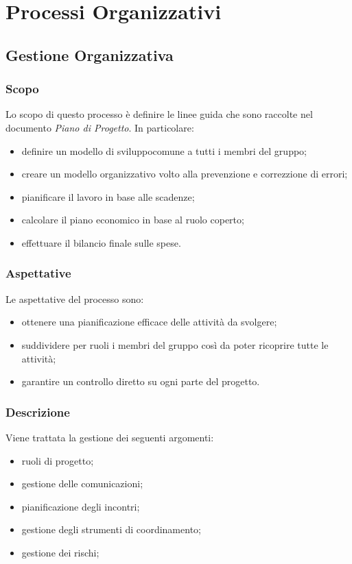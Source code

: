 \section{Processi Organizzativi}
	\subsection{Gestione Organizzativa}
		\subsubsection{Scopo}

		Lo scopo di questo processo è definire le linee guida che sono raccolte nel documento \textit{Piano di Progetto}. In particolare:
		\begin{itemize}
			\item definire un modello di sviluppo\glosp comune a tutti i membri del gruppo; 
			\item creare un modello organizzativo volto alla prevenzione e correzzione di errori;
			\item pianificare il lavoro in base alle scadenze;
			\item calcolare il piano economico in base al ruolo coperto;
			\item effettuare il bilancio finale sulle spese.
		\end{itemize}

		\subsubsection{Aspettative}
		Le aspettative del processo sono:
		\begin{itemize}
			\item ottenere una pianificazione efficace delle attività da svolgere;
			\item suddividere per ruoli i membri del gruppo così da poter ricoprire tutte le attività;
			\item garantire un controllo diretto su ogni parte del progetto.
		\end{itemize}
		\subsubsection{Descrizione}
		Viene trattata la gestione dei seguenti argomenti:
		\begin{itemize}
			\item ruoli di progetto;
			\item gestione delle comunicazioni;
			\item pianificazione degli incontri;
			\item gestione degli strumenti di coordinamento;
			\item gestione dei rischi;
		\end{itemize}
